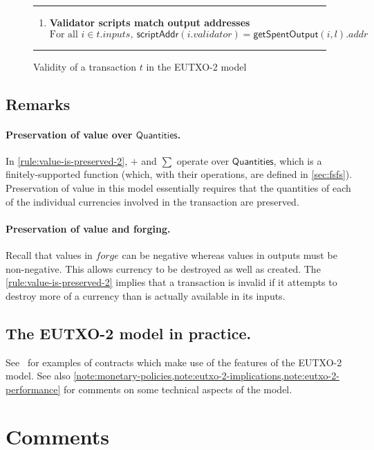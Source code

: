 \documentclass[a4paper]{article}
\newcounter{note}
\newcommand{\s}{\textsf}  %
\newcommand{\msf}[1]{\ensuremath{\mathsf{#1}}}
\newcommand{\mi}[1]{\ensuremath{\mathit{#1}}}
\newcommand\rfskip{7pt}
\newenvironment{ruledfigure}[1]{\begin{figure}[#1]\hrule\vspace{\rfskip}}{\vspace{\rfskip}\hrule\end{figure}}
\newcommand{\scriptAddr}{\msf{scriptAddr}}
\newcommand{\inputs}{\mi{inputs}}
\newcommand{\forge}{\mi{forge}}
\newcommand{\addr}{\mi{addr}}
\newcommand{\validator}{\mi{validator}}
\newcommand{\getSpent}{\msf{getSpentOutput}}
\newcommand{\qtymap}{\ensuremath{\s{Quantities}}}
\begin{document}
\begin{ruledfigure}{H}
\begin{enumerate}
\item
  \label{rule:validator-scripts-hash-2}
  \textbf{Validator scripts match output addresses}
  \begin{displaymath}
    \textrm{For all } i \in t.\inputs,\ \scriptAddr(i.\validator) = \getSpent(i, l).\addr
  \end{displaymath}

\end{enumerate}
\caption{Validity of a transaction $t$ in the EUTXO-2 model}
\label{fig:eutxo-2-validity}
\end{ruledfigure}

\subsection{Remarks}
\paragraph{Preservation of value over \qtymap{}.}
In \cref{rule:value-is-preserved-2},
$+$ and $\sum$ operate over \qtymap{}, which is
a finitely-supported function (which, with their operations,
are defined in \cref{sec:fsfs}). Preservation of value
in this model essentially requires that the
quantities of each of the individual currencies involved in the
transaction are preserved.

\paragraph{Preservation of value and forging.}
Recall that values in $\forge$ can
be negative whereas values in outputs must be non-negative. This allows
currency to be destroyed as well as created. The
\cref{rule:value-is-preserved-2} implies that a
transaction is invalid if it attempts to destroy more of a currency
than is actually available in its inputs.

\subsection{The EUTXO-2 model in practice.}
See~\cite{Plutus-book} for examples of contracts which make use of the
features of the EUTXO-2 model.  See also
\cref{note:monetary-policies,note:eutxo-2-implications,note:eutxo-2-performance}
for comments on some technical aspects of the model.

\appendix
\section{Comments}
\label{appendix:comments}
\end{document}
